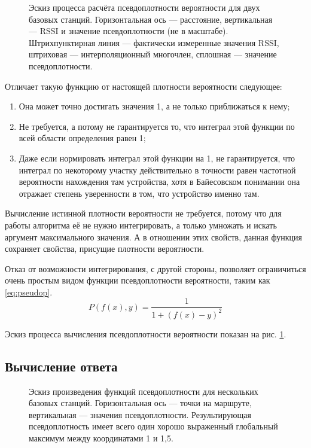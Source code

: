 \begin{figure}[H]
	\caption{Эскиз процесса расчёта псевдоплотности вероятности для двух базовых станций. Горизонтальная ось --- расстояние, вертикальная --- RSSI и значение псевдоплотности (не в масштабе). Штрихпунктирная линия --- фактически измеренные значения RSSI, штриховая --- интерполяционный многочлен, сплошная --- значение псевдоплотности.}
	\label{fig:pseudop-draft}
\end{figure}

Отличает такую функцию от настоящей плотности вероятности следующее:
\begin{enumerate}
	\item
		Она может точно достигать значения 1, а не только приближаться к нему;
	\item
		Не требуется, а потому не гарантируется то, что интеграл этой функции по всей области определения равен 1;
	\item
		Даже если нормировать интеграл этой функции на 1, не гарантируется, что интеграл по некоторому участку действительно в точности равен частотной вероятности нахождения там устройства, хотя в Байесовском понимании она отражает степень уверенности в том, что устройство именно там.
\end{enumerate}

Вычисление истинной плотности вероятности не требуется, потому что для работы алгоритма её не нужно интегрировать, а только умножать и искать аргумент максимального значения. А в отношении этих свойств, данная функция сохраняет свойства, присущие плотности вероятности.

Отказ от возможности интегрирования, с другой стороны, позволяет ограничиться очень простым видом функции псевдоплотности вероятности, таким как \ref{eq:pseudop}.
\begin{equation}
	P(f(x), y) = \frac{1}{1+(f(x)-y)^2}
	\label{eq:pseudop}
\end{equation}

Эскиз процесса вычисления псевдоплотности вероятности показан на рис. \ref{fig:pseudop-draft}.

\subsection{Вычисление ответа}

\begin{figure}[H]
	\caption{Эскиз произведения функций псевдоплотности для нескольких базовых станций. Горизонтальная ось --- точки на маршруте, вертикальная --- значения псевдоплотности. Результирующая псевдоплотность имеет всего один хорошо выраженный глобальный максимум между координатами 1 и 1,5.}
	\label{fig:total-pseudop-draft}
\end{figure}

